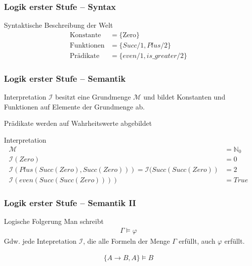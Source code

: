 \begin{frame}
	\frametitle{Logik erster Stufe -- Syntax}

	\begin{block}{Syntaktische Beschreibung der Welt}
		\begin{align*}
			\text{Konstante} &= \{\text{Zero}\}\\
			\text{Funktionen}  &=\{Succ/1, Plus/2 \}\\
			\text{Prädikate} &=\{even/1, is\_greater/2 \}
		\end{align*}
	\end{block}

\end{frame}

\begin{frame}
	\frametitle{Logik erster Stufe -- Semantik}
	Interpretation $\mathcal{I}$ besitzt eine Grundmenge $\mathcal{M}$
	und bildet Konstanten und Funktionen auf Elemente der Grundmenge ab.

	Prädikate werden auf Wahrheitswerte abgebildet

	\begin{block}{Interpretation}
		\begin{align*}
			\mathcal{M} &= \mathbb{N}_0\\
			\mathcal{I}(Zero) &= 0\\
			\mathcal{I}(Plus(Succ(Zero), Succ(Zero))) = \mathcal{I}(Succ(Succ(Zero)) &=  2\\
			\mathcal{I}(even(Succ(Succ(Zero)))) &= True
		\end{align*}
	\end{block}
\end{frame}

\begin{frame}
	\frametitle{Logik erster Stufe -- Semantik II}
	\begin{block}{Logische Folgerung}
		Man schreibt
		\begin{align*}
			\Gamma \vDash \varphi
		\end{align*}
		Gdw. jede Intepretation $\mathcal{I}$, die alle Formeln
		der Menge $\Gamma$ erfüllt, auch $\varphi$ erfüllt.
	\end{block}
	\begin{bsp}
		\begin{align*}
			\{A \rightarrow B, A\} \vDash B
		\end{align*}
	\end{bsp}
\end{frame}

